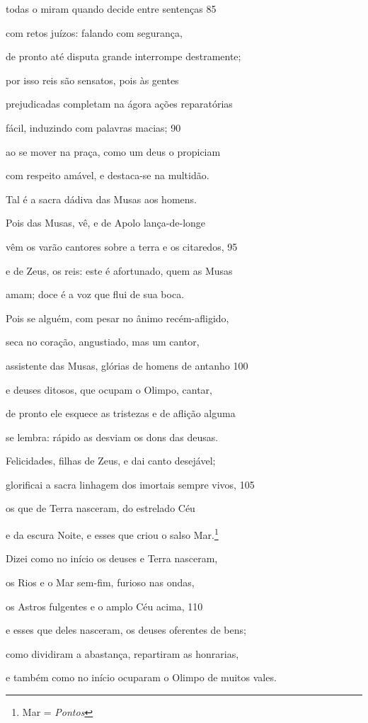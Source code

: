 todas o miram quando decide entre sentenças \num{85}

com retos juízos: falando com segurança,

de pronto até disputa grande interrompe destramente;

por isso reis são sensatos, pois às gentes

prejudicadas completam na ágora ações reparatórias

fácil, induzindo com palavras macias; \num{90}

ao se mover na praça, como um deus o propiciam

com respeito amável, e destaca-se na multidão.

\quad{}Tal é a sacra dádiva das Musas aos homens.

Pois das Musas, vê, e de Apolo lança-de-longe

vêm os varão cantores sobre a terra e os citaredos, \num{95}

e de Zeus, os reis: este é afortunado, quem as Musas

amam; doce é a voz que flui de sua boca.

Pois se alguém, com pesar no ânimo recém-afligido,

seca no coração, angustiado, mas um cantor,

assistente das Musas, glórias de homens de antanho \num{100}

e deuses ditosos, que ocupam o Olimpo, cantar,

de pronto ele esquece as tristezas e de aflição alguma

se lembra: rápido as desviam os dons das deusas.

\quad{}Felicidades, filhas de Zeus, e dai canto desejável;

glorificai a sacra linhagem dos imortais sempre vivos, \num{105}

os que de Terra nasceram, do estrelado Céu

e da escura Noite, e esses que criou o salso Mar.\footnote{Mar = \emph{Pontos}}

Dizei como no início os deuses e Terra nasceram,

os Rios e o Mar sem-fim, furioso nas ondas,

os Astros fulgentes e o amplo Céu acima, \num{110}

e esses que deles nasceram, os deuses oferentes de bens;

como dividiram a abastança, repartiram as honrarias,

e também como no início ocuparam o Olimpo de muitos \qb{}vales.

